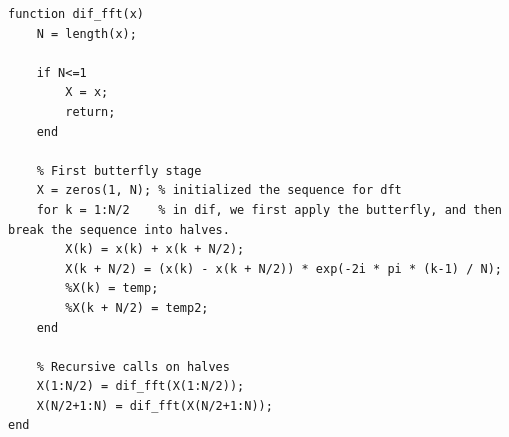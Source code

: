 \documentclass[12pt]{report}
\begin{document}
  \begin{lstlisting}[caption={Custom function for DIF-FFT.}]
  function dif_fft(x)
    N = length(x);
    
    if N<=1
        X = x;
        return;
    end

    % First butterfly stage
    X = zeros(1, N); % initialized the sequence for dft
    for k = 1:N/2    % in dif, we first apply the butterfly, and then break the sequence into halves.
        X(k) = x(k) + x(k + N/2);
        X(k + N/2) = (x(k) - x(k + N/2)) * exp(-2i * pi * (k-1) / N);
        %X(k) = temp;
        %X(k + N/2) = temp2;
    end

    % Recursive calls on halves
    X(1:N/2) = dif_fft(X(1:N/2));
    X(N/2+1:N) = dif_fft(X(N/2+1:N));
end
  \end{lstlisting}
\end{document}
